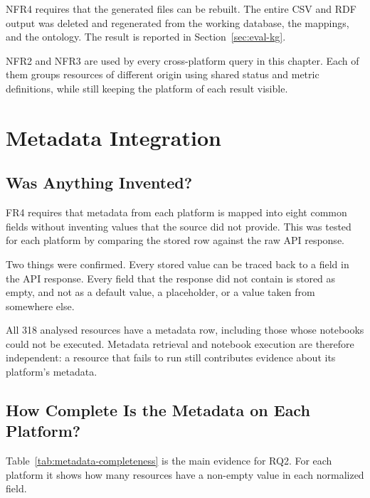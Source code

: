 NFR4 requires that the generated files can be rebuilt. The entire CSV and RDF output was deleted and regenerated from the working database, the mappings, and the ontology. The result is reported in Section~\ref{sec:eval-kg}.

NFR2 and NFR3 are used by every cross-platform query in this chapter. Each of them groups resources of different origin using shared status and metric definitions, while still keeping the platform of each result visible.

\section{Metadata Integration}
\label{sec:eval-metadata}

\subsection{Was Anything Invented?}

FR4 requires that metadata from each platform is mapped into eight common fields without inventing values that the source did not provide. This was tested for each platform by comparing the stored row against the raw API response.

Two things were confirmed. Every stored value can be traced back to a field in the API response. Every field that the response did not contain is stored as empty, and not as a default value, a placeholder, or a value taken from somewhere else.

All 318 analysed resources have a metadata row, including those whose notebooks could not be executed. Metadata retrieval and notebook execution are therefore independent: a resource that fails to run still contributes evidence about its platform's metadata.

\subsection{How Complete Is the Metadata on Each Platform?}

Table~\ref{tab:metadata-completeness} is the main evidence for RQ2. For each platform it shows how many resources have a non-empty value in each normalized field.

